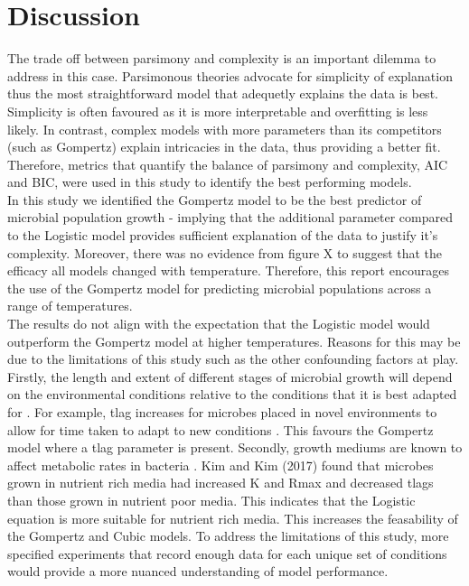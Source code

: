 \documentclass[12pt]{article}
\begin{document}
\section{Discussion}

The trade off between parsimony and complexity is an important dilemma to address in this case. Parsimonous theories advocate for simplicity of explanation \cite{Coelho2019} thus the most straightforward model that adequetly explains the data is best. Simplicity is often favoured as it is more interpretable and overfitting is less likely. In contrast, complex models with more parameters than its competitors (such as Gompertz) explain intricacies in the data, thus providing a better fit. Therefore, metrics that quantify the balance of parsimony and complexity, AIC and BIC, were used in this study to identify the best performing models.\\

In this study we identified the Gompertz model to be the best predictor of microbial population growth - implying that the additional parameter compared to the Logistic model provides sufficient explanation of the data to justify it's complexity. Moreover, there was no evidence from figure X to suggest that the efficacy all models changed with temperature. Therefore, this report encourages the use of the Gompertz model for predicting microbial populations across a range of temperatures. \\

The results do not align with the expectation that the Logistic model would outperform the Gompertz model at higher temperatures. Reasons for this may be due to the limitations of this study such as the other confounding factors at play. Firstly, the length and extent of different stages of microbial growth will depend on the environmental conditions relative to the conditions that it is best adapted for \cite{Dey2020}. For example, tlag increases for microbes placed in novel environments to allow for time taken to adapt to new conditions \cite{Rolfe2012}. This favours the Gompertz model where a tlag parameter is present. Secondly, growth mediums are known to affect metabolic rates in bacteria \cite{KIM201764}. Kim and Kim (2017) found that microbes grown in nutrient rich media had increased K and Rmax and decreased tlags than those grown in nutrient poor media. This indicates that the Logistic equation is more suitable for nutrient rich media.  This increases the feasability of the Gompertz and Cubic models. To address the limitations of this study, more specified experiments that record enough data for each unique set of conditions would provide a more nuanced understanding of model performance.\\
\end{document}
